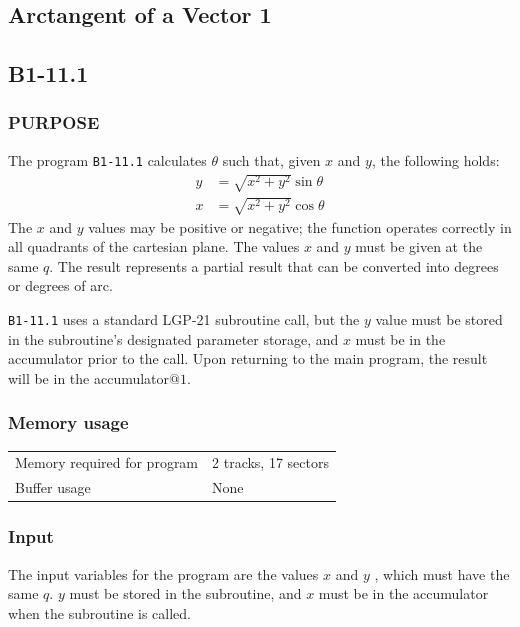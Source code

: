\documentclass{article}
\begin{document}
\newpage

\subsection{Arctangent of a Vector 1}
\label{sec:vector_evolution_of_arctangent_1}

\subsection*{B1-11.1}

\subsubsection*{PURPOSE}
The program \texttt{B1-11.1} calculates $\theta$ such that, given $x$ and $y$, the following holds:
\begin{align}
    y &= \sqrt{x^2 + y^2} \sin \theta \\
    x &= \sqrt{x^2 + y^2} \cos \theta
\end{align}
\noindent
The $x$ and $y$ values may be positive or negative; the function operates correctly in all quadrants of the cartesian plane. The values $x$ and $y$ must be given at the same $q$. The result represents a partial result that can be converted into degrees or degrees of arc.

\texttt{B1-11.1} uses a standard LGP-21 subroutine call, but the $y$ value must be stored in the subroutine's designated parameter storage, and $x$ must be in the accumulator prior to the call. Upon returning to the main program, the result will be in the accumulator$@1$.

\subsubsection*{Memory usage}
\begin{center}
\begin{tabular}{ll}
    \toprule
    Memory required for program & 2 tracks, 17 sectors \\
    Buffer usage & None \\
    \bottomrule
\end{tabular}
\end{center}

\subsubsection*{Input}
The input variables for the program are the values $x$ and $y$ , which must have the same $q$. $y$ must be stored in the subroutine, and $x$ must be in the accumulator when the subroutine is called.
\end{document}
